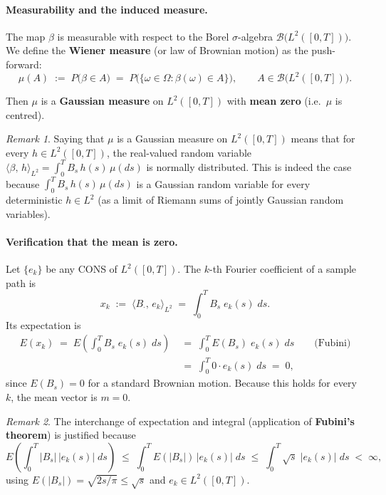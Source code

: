 \documentclass[11pt]{article}
\theoremstyle{definition}
\theoremstyle{remark}
\newtheorem{remark}{Remark}
\begin{document}
\paragraph{Measurability and the induced measure.}

The map $\beta$ is measurable with respect to the Borel
$\sigma$-algebra $\mathcal{B}\!\bigl(L^2([0,T])\bigr)$.
We define the \textbf{Wiener measure} (or law of Brownian motion)
as the push-forward:
\[
    \mu(A)
    \;:=\;
    P\!\bigl(\beta \in A\bigr)
    \;=\;
    P\!\bigl(\{\omega \in \Omega : \beta(\omega) \in A\}\bigr),
    \qquad
    A \in \mathcal{B}\!\bigl(L^2([0,T])\bigr).
\]

Then $\mu$ is a \textbf{Gaussian measure} on $L^2([0,T])$ with
\textbf{mean zero} (i.e.\ $\mu$ is centred).

\begin{remark}
Saying that $\mu$ is a Gaussian measure on $L^2([0,T])$ means that
for every $h \in L^2([0,T])$, the real-valued random variable
$\langle \beta,\, h \rangle_{L^2} = \int_0^T B_s\,h(s)\, \mu(ds)$
is normally distributed.
This is indeed the case because $\int_0^T B_s\,h(s)\,\mu(ds)$ is a
Gaussian random variable for every deterministic $h \in L^2$
(as a limit of Riemann sums of jointly Gaussian random variables).
\end{remark}

\paragraph{Verification that the mean is zero.}

Let $\{e_k\}$ be any CONS of $L^2([0,T])$.
The $k$-th Fourier coefficient of a sample path is
\[
    x_k
    \;:=\;
    \langle B_\cdot,\, e_k \rangle_{L^2}
    \;=\;
    \int_0^T B_s\;e_k(s)\;ds.
\]
Its expectation is
\begin{align*}
    E(x_k)
    \;=\;
    E\!\left(\int_0^T B_s\;e_k(s)\;ds\right)
    &\;=\;
    \int_0^T E(B_s)\;e_k(s)\;ds
    \qquad \text{(Fubini)} \\[6pt]
    &\;=\;
    \int_0^T 0 \cdot e_k(s)\;ds
    \;=\; 0,
\end{align*}
since $E(B_s) = 0$ for a standard Brownian motion.
Because this holds for every $k$, the mean vector is $m = 0$.

\begin{remark}
The interchange of expectation and integral (application of
\textbf{Fubini's theorem}) is justified because
\[
    E\!\left(\int_0^T |B_s|\,|e_k(s)|\;ds\right)
    \;\le\;
    \int_0^T E(|B_s|)\,|e_k(s)|\;ds
    \;\le\;
    \int_0^T \sqrt{s}\;|e_k(s)|\;ds
    \;<\;\infty,
\]
using $E(|B_s|) = \sqrt{2s/\pi} \le \sqrt{s}$ and
$e_k \in L^2([0,T])$.
\end{remark}
\end{document}
